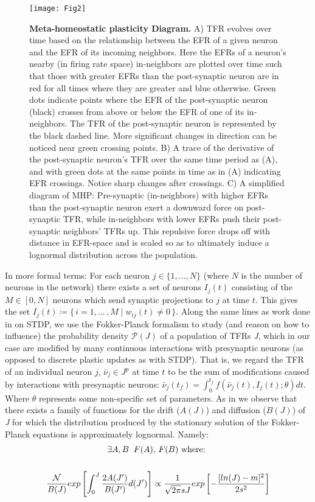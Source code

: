 \documentclass[10pt,letterpaper]{article}
\begin{document}
\begin{figure}[!h]
	\centering
	\texttt{[image: Fig2]}
	\caption{{\bf Meta-homeostatic plasticity Diagram. }
		 A) TFR evolves over time based on the relationship between the EFR of a given neuron and the EFR of its incoming neighbors. Here the EFRs of a neuron's nearby (in firing rate space) in-neighbors are plotted over time such that those with greater EFRs than the post-synaptic neuron are in red for all times where they are greater and blue otherwise. Green dots indicate points where the EFR of the post-synaptic neuron (black) crosses from above or below the EFR of one of its in-neighbors. The TFR of the post-synaptic neuron is represented by the black dashed line. More significant changes in direction can be noticed near green crossing points. B) A trace of the derivative of the post-synaptic neuron's TFR over the same time period as (A), and with green dots at the same points in time as in (A) indicating EFR crossings. Notice sharp changes after crossings. C) A simplified diagram of MHP: Pre-synaptic (in-neighbors) with higher EFRs than the post-synaptic neuron exert a downward force on post-synaptic TFR, while in-neighbors with lower EFRs push their post-synaptic neighbors' TFRs up. This repulsive force drops off with distance in EFR-space and is scaled so as to ultimately induce a lognormal distribution across the population. }
	\label{Fig2}
\end{figure}

In more formal terms: For each neuron $j \in \{1, ... , N\}$ (where $N$ is the number of neurons in the network) there exists a set of neurons $I_j(t)$ consisting of the $M \in [0, N]$ neurons which send synaptic projections to $j$ at time $t$. This gives the set  $I_j(t) \coloneqq \{\,i = 1, ...\, , M \;|\; w_{ij}(t) \neq 0\,\}$. Along the same lines as work done in \cite{gilson2011stability} on STDP, we use the Fokker-Planck formalism to study (and reason on how to influence) the probability density $\mathcal{P}(J)$ of a population of TFRs \emph{J}, which in our case are modified by many continuous interactions with presynaptic neurons (as opposed to discrete plastic updates as with STDP). That is, we regard the TFR of an individual neuron $j$, $\bar{\nu}_j \in J^p$ at time $t$ to be the sum of modifications caused by interactions with presynaptic neurons: $\bar{\nu}_j(t_f) = \int_{0}^{t_f} f(\bar{\nu}_j(t), I_j(t); \theta) dt$. Where $\theta$ represents some non-specific set of parameters. As in \cite{gilson2011stability} we observe that there exists a family of functions for the drift ($A(J)$) and diffusion ($B(J)$) of \emph{J} for which the distribution produced by the stationary solution of the Fokker-Planck equations is approximately lognormal. Namely:
\begin{gather}
	\exists A,B \;\;F(A),\,F(B) \text{  where: } \notag \\ \notag\\  \frac{\mathcal{N}}{B(J)}  exp \left[\int_{0}^{J }  \frac{2A(J^\prime)} {B(J^\prime)} d(J^\prime)\right]\propto \frac{1}{\sqrt{2\pi}sJ} exp\left[-\frac{[ln(J)-m]^2}{2s^2}\right] \notag \\ 
\end{gather}
\end{document}
